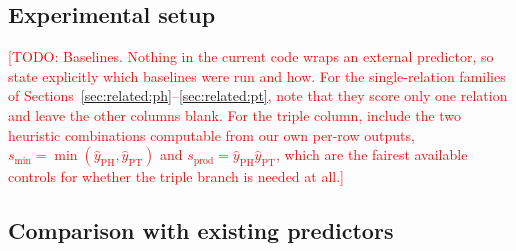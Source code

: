 \documentclass[webpdf,modern,large,namedate]{oup-authoring-template}
\theoremstyle{thmstyleone}
\theoremstyle{thmstyletwo}
\theoremstyle{thmstylethree}
\DeclareRobustCommand{\TODO}[1]{\textcolor{red}{[TODO: #1]}}
\newcommand{\PHm}{\mathrm{PH}}
\newcommand{\PTm}{\mathrm{PT}}
\begin{document}
\subsection{Experimental setup}\label{sec:results:setup}

\TODO{Baselines. Nothing in the current code wraps an external predictor, so
state explicitly which baselines were run and how. For the single-relation
families of Sections~\ref{sec:related:ph}--\ref{sec:related:pt}, note that they
score only one relation and leave the other columns blank. For the triple
column, include the two heuristic combinations computable from our own
per-row outputs, $s_{\min}=\min(\hat y_{\PHm},\hat y_{\PTm})$ and
$s_{\mathrm{prod}}=\hat y_{\PHm}\hat y_{\PTm}$, which are the fairest
available controls for whether the triple branch is needed at all.}

\subsection{Comparison with existing predictors}\label{sec:results:main}
\end{document}
